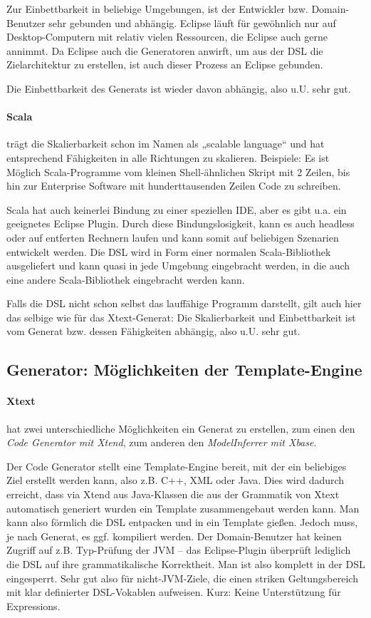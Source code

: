 Zur Einbettbarkeit in beliebige Umgebungen, ist der Entwickler bzw.
Domain-Benutzer sehr gebunden und abhängig. Eclipse läuft für gewöhnlich
nur auf Desktop-Computern mit relativ vielen Ressourcen, die Eclipse auch
gerne annimmt. Da Eclipse auch die Generatoren anwirft, um aus der DSL
die Zielarchitektur zu erstellen, ist auch dieser Prozess an Eclipse gebunden.

Die Einbettbarkeit des Generats ist wieder davon abhängig, also u.U.
sehr gut.

\paragraph{Scala} trägt die Skalierbarkeit schon im Namen als
„scalable language“ und hat entsprechend Fähigkeiten in alle Richtungen
zu skalieren. Beispiele: Es ist Möglich Scala-Programme vom kleinen
Shell-ähnlichen Skript mit 2 Zeilen, bis hin zur Enterprise Software
mit hunderttausenden Zeilen Code zu schreiben.

Scala hat auch keinerlei Bindung zu einer speziellen IDE, aber es gibt
u.a. ein geeignetes Eclipse Plugin. Durch diese Bindungslosigkeit, kann
es auch headless oder auf entferten Rechnern laufen und kann somit auf
beliebigen Szenarien entwickelt werden.
Die DSL wird in Form einer normalen Scala-Bibliothek ausgeliefert und
kann quasi in jede Umgebung eingebracht werden, in die auch eine andere
Scala-Bibliothek eingebracht werden kann.

Falls die DSL nicht schon selbst das lauffähige Programm darstellt, gilt
auch hier das selbige wie für das Xtext-Generat: Die Skalierbarkeit und
Einbettbarkeit ist vom Generat bzw. dessen Fähigkeiten abhängig, also u.U.
sehr gut.


\subsection{Generator: Möglichkeiten der Template-Engine}\label{sec-generator}

\paragraph{Xtext} hat zwei unterschiedliche Möglichkeiten ein
Generat zu erstellen, zum einen den \emph{Code Generator mit Xtend},
zum anderen den \emph{ModelInferrer mit Xbase}.

Der Code Generator stellt eine Template-Engine bereit, mit der
ein beliebiges Ziel erstellt werden kann, also z.B. C++, XML oder Java.
Dies wird dadurch erreicht, dass via Xtend aus Java-Klassen die aus der
Grammatik von Xtext automatisch generiert wurden ein Template zusammengebaut
werden kann. Man kann also förmlich die DSL entpacken und in ein Template
gießen.
Jedoch muss, je nach Generat, es ggf. kompiliert werden. Der
Domain-Benutzer hat keinen Zugriff auf z.B. Typ-Prüfung der JVM --
das Eclipse-Plugin überprüft lediglich die DSL auf ihre
grammatikalische Korrektheit. Man ist also komplett in der DSL eingesperrt.
Sehr gut also für nicht-JVM-Ziele, die einen striken Geltungsbereich mit
klar definierter DSL-Vokablen aufweisen. Kurz: Keine Unterstützung für
Expressions.

